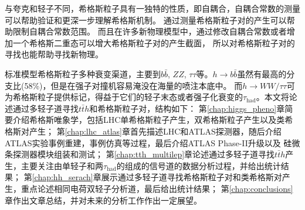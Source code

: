 与夸克和轻子不同，希格斯粒子具有一独特的性质，即自耦合，自耦合常数的测量可以帮助验证和更深一步理解希格斯机制。
通过测量希格斯粒子对的产生可以帮助限制自耦合常数范围。
而且在许多新物理模型中，通过修改自耦合常数或者增加一个希格斯二重态可以增大希格斯粒子对的产生截面，
所以对希格斯粒子对的寻找也能帮助寻找新物理。

标准模型希格斯粒子多种衰变渠道，主要到$b\bar{b}$, $ZZ$, $\tau\tau$等。$h\rightarrow b\bar{b}$虽然有最高的分支比(58\%)，但是在强子对撞机容易淹没在海量的喷注本底中。
而$h\rightarrow WW/\tau\tau$可为希格斯粒子提供标记，得益于它们的轻子末态或者强子化衰变的$\tau_{\text{had}}$。本文将论述通过多轻子道寻找$t\bar{t}h$和希格斯粒子对，结构如下：
第\ref{chap:higgs_pheno}章简要介绍希格斯唯象学，包括LHC单希格斯粒子产生，双希格斯粒子产生以及类希格斯对产生；
第\ref{chap:lhc_atlas}章首先描述LHC和ATLAS探测器，随后介绍ATLAS实验事例重建，事例仿真等过程，最后介绍ATLAS Phase-II升级以及
硅微条探测器模块组装和测试；
第\ref{chap:tth_multilep}章论述通过多轻子道寻找$t\bar{t}h$产生，主要关注由单轻子和两$\tau_{\text{had}}$的组成的信号道的数据分析过程，并给出统计结果；
第\ref{chap:hh_serach}章展示通过多轻子道寻找希格斯粒子对和类希格斯对产生，重点论述相同电荷双轻子分析道，最后给出统计结果；
第\ref{chap:conclusions}章作出文章总结，并对未来的分析工作作出一定展望。
